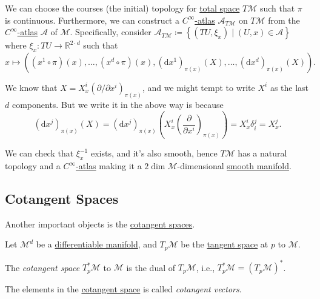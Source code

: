 We can choose the courses (the initial) topology for \hyperref[def:tangent-bundle-total-space]{total space} \(T \mathcal{M} \) such that \(\pi \) is continuous. Furthermore, we can construct a \hyperref[def:atlas]{\(C^{\infty} \)-atlas} \(\mathcal{A} _{T\mathcal{M} }\) on \(T\mathcal{M} \) from the \hyperref[def:atlas]{\(C^{\infty} \)-atlas} \(\mathcal{A} \) of \(\mathcal{M} \). Specifically, consider \(\mathcal{A} _{T\mathcal{M} } \coloneqq \left\{ (TU, \xi _x) \mid (U, x)\in \mathcal{A} \right\}\) where \(\xi _x \colon T U \to \mathbb{R} ^{2\cdot d }\) such that
\[
	x \mapsto \left( (x^1 \circ \pi )(x), \ldots , (x^d \circ \pi ) (x), (\mathrm{d} x^1)_{\pi (x)}(X), \ldots , (\mathrm{d} x^{d})_{\pi (x) }(X) \right) .
\]

\begin{intuition}
	We know that \(X = X^i_x (\partial / \partial x^i)_{\pi (x)}\), and we might tempt to write \(X^i\) as the last \(d\) components. But we write it in the above way is because
	\[
		(\mathrm{d} x^j)_{\pi (x)} (X)
		= (\mathrm{d} x^j)_{\pi (x)} \left( X^i_x \left( \frac{\partial }{\partial x^i} \right) _{\pi (x)} \right)
		= X^i_x \delta ^j_i
		= X^j_x.
	\]
\end{intuition}

\begin{note}
	We can check that \(\xi _x ^{-1} \) exists, and it's also smooth, hence \(T\mathcal{M} \) has a natural topology and a \hyperref[def:atlas]{\(C^{\infty} \)-atlas} making it a \(2 \dim \mathcal{M} \)-dimensional \hyperref[def:smooth-manifold]{smooth manifold}.
\end{note}

\subsection{Cotangent Spaces}
Another important objects is the \hyperref[def:cotangent-space]{cotangent spaces}.

\begin{definition*}
	Let \(\mathcal{M} ^d\) be a \hyperref[def:smooth-manifold]{differentiable manifold}, and \(T_p \mathcal{M} \) be the \hyperref[def:tangent-space]{tangent space} at \(p\) to \(\mathcal{M} \).
	\begin{definition}\label{def:cotangent-space}
		The \emph{cotangent space} \(T^{\ast} _p \mathcal{M} \) to \(\mathcal{M} \) is the dual of \(T_p \mathcal{M} \), i.e., \(T^{\ast} _p\mathcal{M} = (T_p \mathcal{M} )^{\ast} \).
	\end{definition}
	\begin{definition}\label{def:cotangent-vector}
		The elements in the \hyperref[def:cotangent-space]{cotangent space} is called \emph{cotangent vectors}.
	\end{definition}
\end{definition*}

